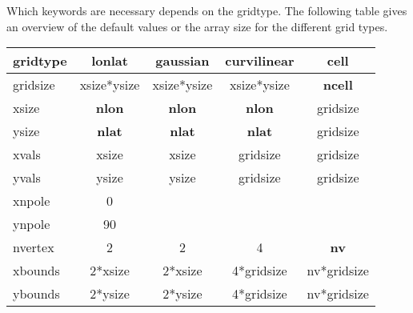 \vspace{4mm}

Which keywords are necessary depends on the gridtype.
The following table gives an overview of the default values or the array size for the different
grid types.


\vspace{2mm}
\hspace{2cm}
\begin{tabular}[c]{|l||c|c|c|c|}
\hline
gridtype   & lonlat      & gaussian    & curvilinear & cell \\
\hline
\hline
gridsize   & xsize*ysize & xsize*ysize & xsize*ysize & {\bf ncell} \\
\hline
xsize      & {\bf nlon} & {\bf nlon} & {\bf nlon} & gridsize \\
\hline
ysize      & {\bf nlat} & {\bf nlat} & {\bf nlat} & gridsize \\
\hline
xvals      & xsize & xsize & gridsize & gridsize \\
\hline
yvals      & ysize & ysize & gridsize & gridsize \\
\hline
xnpole     & 0     &       &          &          \\
\hline
ynpole     & 90    &       &          &          \\
\hline
nvertex    & 2 & 2 & 4 & {\bf nv} \\
\hline
xbounds    & 2*xsize & 2*xsize & 4*gridsize & nv*gridsize \\
\hline
ybounds    & 2*ysize & 2*ysize & 4*gridsize & nv*gridsize \\
\hline
\end{tabular}

